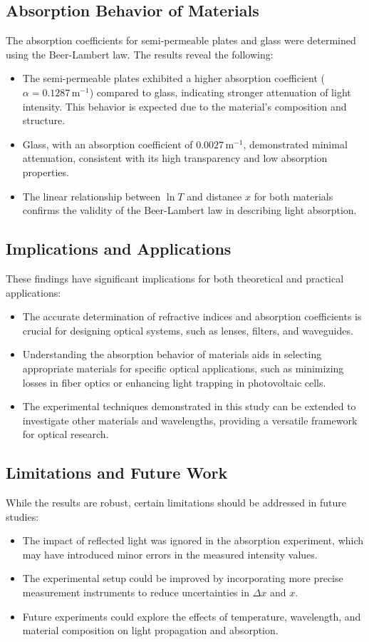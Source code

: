 \documentclass[journal]{IEEEtran}
\begin{document}
\subsection{Absorption Behavior of Materials}
The absorption coefficients for semi-permeable plates and glass were determined using the Beer-Lambert law. The results reveal the following:
\begin{itemize}
    \item The semi-permeable plates exhibited a higher absorption coefficient ($\alpha = 0.1287 \, \text{m}^{-1}$) compared to glass, indicating stronger attenuation of light intensity. This behavior is expected due to the material's composition and structure.
    \item Glass, with an absorption coefficient of $0.0027 \, \text{m}^{-1}$, demonstrated minimal attenuation, consistent with its high transparency and low absorption properties.
    \item The linear relationship between $\ln T$ and distance $x$ for both materials confirms the validity of the Beer-Lambert law in describing light absorption.
\end{itemize}
\subsection{Implications and Applications}
These findings have significant implications for both theoretical and practical applications:
\begin{itemize}
    \item The accurate determination of refractive indices and absorption coefficients is crucial for designing optical systems, such as lenses, filters, and waveguides.
    \item Understanding the absorption behavior of materials aids in selecting appropriate materials for specific optical applications, such as minimizing losses in fiber optics or enhancing light trapping in photovoltaic cells.
    \item The experimental techniques demonstrated in this study can be extended to investigate other materials and wavelengths, providing a versatile framework for optical research.
\end{itemize}

\subsection{Limitations and Future Work}
While the results are robust, certain limitations should be addressed in future studies:
\begin{itemize}
    \item The impact of reflected light was ignored in the absorption experiment, which may have introduced minor errors in the measured intensity values.
    \item The experimental setup could be improved by incorporating more precise measurement instruments to reduce uncertainties in $\Delta x$ and $x$.
    \item Future experiments could explore the effects of temperature, wavelength, and material composition on light propagation and absorption.
\end{itemize}
\end{document}
